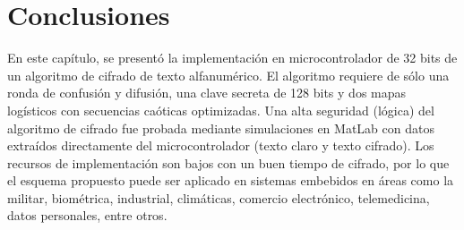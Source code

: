 \section{Conclusiones}
En este capítulo, se presentó la implementación en microcontrolador de 32 bits de un algoritmo de cifrado de texto alfanumérico. El algoritmo requiere de sólo una ronda de confusión y difusión, una clave secreta de 128 bits y dos mapas logísticos con secuencias caóticas optimizadas. Una alta seguridad (lógica) del algoritmo de cifrado fue probada mediante simulaciones en MatLab con datos extraídos directamente del microcontrolador  (texto claro y texto cifrado). Los recursos de implementación son bajos con un buen tiempo de cifrado, por lo que el esquema propuesto puede ser aplicado en sistemas embebidos en áreas como la militar, biométrica, industrial, climáticas, comercio electrónico, telemedicina, datos personales, entre otros.   

